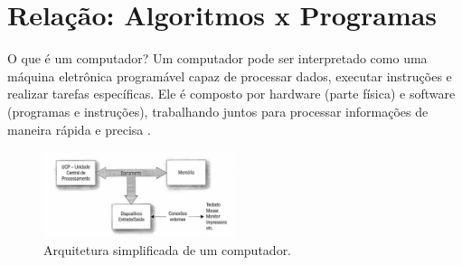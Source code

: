 \section{Relação: Algoritmos x Programas}

\begin{frame}{O que é um computador?}
  Um computador pode ser interpretado como uma máquina eletrônica programável capaz de processar dados, executar instruções e realizar tarefas específicas.  Ele é composto por hardware (parte física) e software (programas e instruções), trabalhando juntos para processar informações de maneira rápida e precisa \cite{medina2006algoritmos}.
  \begin{figure}
    \includegraphics[width=0.5\textwidth]{figuras/Arquitetura.png}
    \caption{Arquitetura simplificada de um computador.}
  \end{figure}
\end{frame}